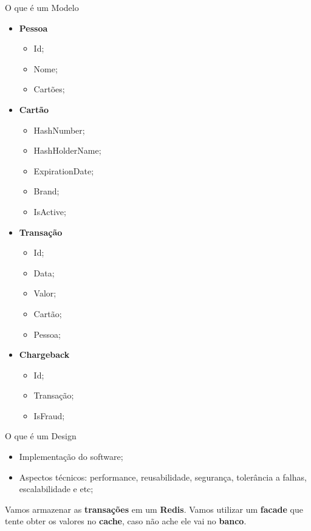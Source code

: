 \documentclass[aspectratio=169]{beamer}
\begin{document}
\begin{frame}{O que é um Modelo}	
	\begin{multicols}{2}		
		\begin{itemize}	
			\item \textbf{Pessoa}
			\begin{itemize}	
				\item Id;
				\item Nome;
				\item Cartões;
			\end{itemize}
		\end{itemize}
		\begin{itemize}	
			\item \textbf{Cartão}
			\begin{itemize}	
				\item HashNumber;
				\item HashHolderName;
				\item ExpirationDate;
				\item Brand;
				\item IsActive;
			\end{itemize}
		\end{itemize}
		\begin{itemize}	
			\item \textbf{Transação}
			\begin{itemize}	
				\item Id;
				\item Data;
				\item Valor;
				\item Cartão;
				\item Pessoa;
			\end{itemize}
		\end{itemize}
		\begin{itemize}	
			\item \textbf{Chargeback}
			\begin{itemize}	
				\item Id;
				\item Transação;
				\item IsFraud;
			\end{itemize}
		\end{itemize}
	\end{multicols}
\end{frame}

\begin{frame}{O que é um Design}	
	\begin{itemize}	
		\item Implementação do software;
		\item Aspectos técnicos: performance, reusabilidade, segurança, tolerância a falhas, escalabilidade e etc;
	\end{itemize}
	Vamos armazenar as \textbf{transações} em um \textbf{Redis}. Vamos utilizar um \textbf{facade} que tente obter os valores no \textbf{cache}, caso não ache ele vai no \textbf{banco}. 
\end{frame}
\end{document}
